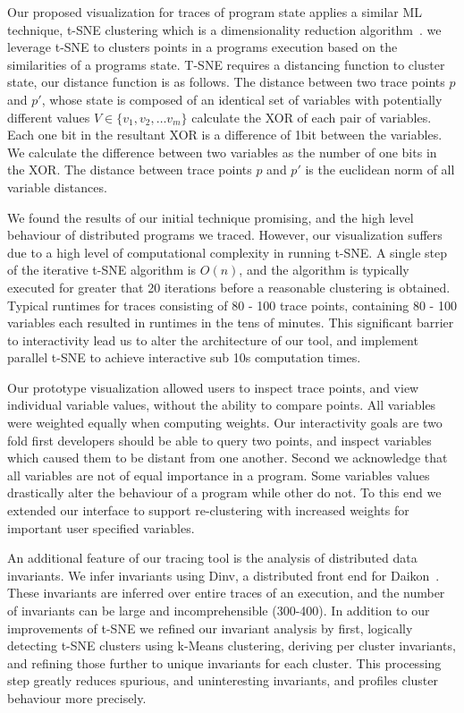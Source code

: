 Our proposed visualization for traces of program state applies a similar ML
technique, t-SNE clustering which is a dimensionality reduction
algorithm~\cite{Hinton_visualizingdata}. we leverage t-SNE to clusters points in a programs
execution based on the similarities of a programs state.  T-SNE requires a
distancing function to cluster state, our distance function is as follows. The
distance between two trace points $p$ and $p'$, whose state is composed of an
identical set of variables with potentially different values $V \in \{v_1, v_2,
\dots v_m\}$ calculate the XOR of each pair of variables. Each one bit in the
resultant XOR is a difference of 1bit between the variables. We calculate the
difference between two variables as the number of one bits in the XOR. The
distance between trace points $p$ and $p'$ is the euclidean norm of all
variable distances.

We found the results of our initial technique promising, and the high level
behaviour of distributed programs we traced. However, our visualization suffers
due to a high level of computational complexity in running t-SNE. A single step
of the iterative t-SNE algorithm is $O(n)$, and the algorithm is typically
executed for greater that 20 iterations before a reasonable clustering is
obtained. Typical runtimes for traces consisting of 80 - 100 trace points,
containing 80 - 100 variables each resulted in runtimes in the tens of minutes.
This significant barrier to interactivity lead us to alter the architecture of
our tool, and implement parallel t-SNE to achieve interactive sub 10s
computation times. 

Our prototype visualization allowed users to inspect trace points, and
view individual variable values, without the ability to compare
points. All variables were weighted equally when computing weights.
Our interactivity goals are two fold first developers should be able
to query two points, and inspect variables which caused them to be
distant from one another. Second we acknowledge that all variables are
not of equal importance in a program. Some variables values
drastically alter the behaviour of a program while other do not. To
this end we extended our interface to support re-clustering with
increased weights for important user specified variables.

An additional feature of our tracing tool is the analysis of
distributed data invariants. We infer invariants using Dinv, a
distributed front end for Daikon~\cite{Ernst99dynamicallydiscovering}.
These invariants are inferred over entire traces of an execution, and
the number of invariants can be large and incomprehensible (300-400).
In addition to our improvements of t-SNE we refined our invariant
analysis by first, logically detecting t-SNE clusters using k-Means
clustering, deriving per cluster invariants, and refining those
further to unique invariants for each cluster. This processing step
greatly reduces spurious, and uninteresting invariants, and profiles
cluster behaviour more precisely.

